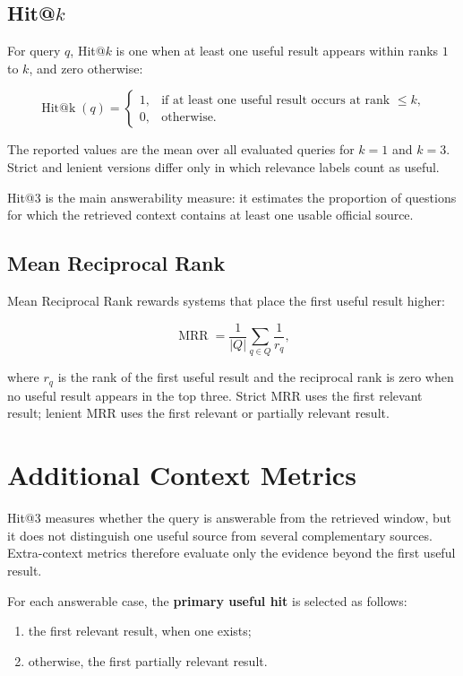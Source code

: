 \subsection{Hit@$k$}
For query $q$, Hit@$k$ is one when at least one useful result appears within ranks $1$ to $k$, and zero otherwise:

\begin{equation}
\operatorname{Hit@k}(q)=
\begin{cases}
1, & \text{if at least one useful result occurs at rank } \leq k,\\
0, & \text{otherwise.}
\end{cases}
\end{equation}

The reported values are the mean over all evaluated queries for $k=1$ and $k=3$. Strict and lenient versions differ only in which relevance labels count as useful.

Hit@3 is the main answerability measure: it estimates the proportion of questions for which the retrieved context contains at least one usable official source.

\subsection{Mean Reciprocal Rank}
Mean Reciprocal Rank rewards systems that place the first useful result higher:

\begin{equation}
\operatorname{MRR}=\frac{1}{|Q|}\sum_{q \in Q}\frac{1}{r_q},
\end{equation}

where $r_q$ is the rank of the first useful result and the reciprocal rank is zero when no useful result appears in the top three. Strict MRR uses the first relevant result; lenient MRR uses the first relevant or partially relevant result.

\section{Additional Context Metrics}
Hit@3 measures whether the query is answerable from the retrieved window, but it does not distinguish one useful source from several complementary sources. Extra-context metrics therefore evaluate only the evidence beyond the first useful result.

For each answerable case, the \textbf{primary useful hit} is selected as follows:

\begin{enumerate}
    \item the first relevant result, when one exists;
    \item otherwise, the first partially relevant result.
\end{enumerate}

